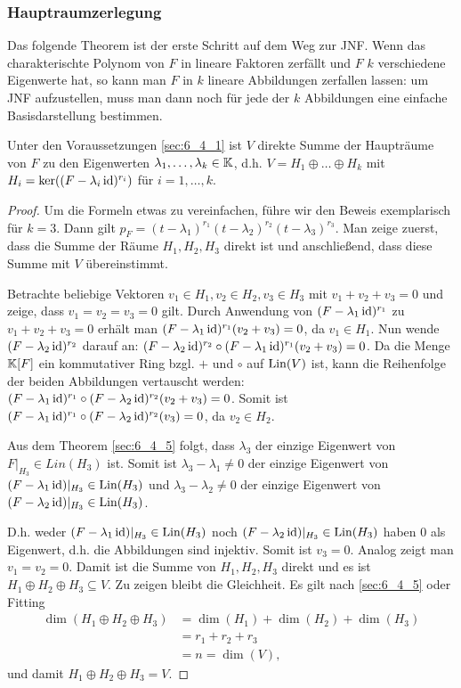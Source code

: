 \subsubsection{Hauptraumzerlegung}

Das folgende Theorem ist der erste Schritt auf dem Weg zur JNF. Wenn das charakterischte Polynom von $F$ in lineare Faktoren zerfällt und $F$ $k$ verschiedene Eigenwerte hat, so kann man $F$ in $k$ lineare Abbildungen zerfallen lassen: um JNF aufzustellen, muss man dann noch für jede der $k$ Abbildungen eine einfache Basisdarstellung bestimmen. 

\begin{thm}
	Unter den Voraussetzungen \ref{sec:6_4_1} ist $ V $ direkte Summe der Haupträume von $ F $ zu den Eigenwerten $ \lambda_1, \ldots, \lambda_k \in \mathbb K $, d.h. $ V = H_1 \oplus \ldots \oplus H_k $ mit $ H_i = \ker((F-\lambda_i\operatorname{id})^{r_i}) $ für $ i = 1, \ldots, k $.
\end{thm}
\begin{proof}
	Um die Formeln etwas zu vereinfachen, führe wir den Beweis exemplarisch für $ k = 3 $. Dann gilt $ p_F = (t-\lambda_1)^{r_1}(t-\lambda_2)^{r_2}(t-\lambda_3)^{r_3} $. Man zeige zuerst, dass die Summe der Räume $ H_1, H_2, H_3 $ direkt ist und anschließend, dass diese Summe mit $ V $ übereinstimmt.
	
	Betrachte beliebige Vektoren $ v_1 \in H_1, v_2 \in H_2, v_3 \in H_3 $ mit $ v_1 + v_2 + v_3 = 0 $ und zeige, dass $ v_1 = v_2 = v_3 = 0 $ gilt. Durch Anwendung von $ (F-\lambda_1\operatorname{id})^{r_1} $ zu $ v_1 + v_2 + v_3 = 0 $ erhält man $ (F-\lambda_1\operatorname{id})^{r_1}(v_2+v_3) = 0 $, da $ v_1 \in H_1 $. Nun wende $ (F-\lambda_2\operatorname{id})^{r_2} $ darauf an: $ (F-\lambda_2\operatorname{id})^{r_2} \circ (F-\lambda_1\operatorname{id})^{r_1}(v_2+v_3) = 0 $.
	Da die Menge $ \mathbb K[F] $ ein kommutativer Ring bzgl. $ + $ und $ \circ $ auf $ \operatorname{Lin}(V) $ ist, kann die Reihenfolge der beiden Abbildungen vertauscht werden: $ (F-\lambda_1\operatorname{id})^{r_1} \circ (F-\lambda_2\operatorname{id})^{r_2}(v_2 + v_3) = 0 $. Somit ist $ (F-\lambda_1\operatorname{id})^{r_1} \circ (F-\lambda_2\operatorname{id})^{r_2}(v_3) = 0 $, da $ v_2 \in H_2 $.
	
	Aus dem Theorem \ref{sec:6_4_5} folgt, dass $ \lambda_3 $ der einzige Eigenwert von $ F|_{H_3} \in Lin(H_3) $ ist. Somit ist $ \lambda_3 - \lambda_1 \neq 0 $ der einzige Eigenwert von $ (F-\lambda_1\operatorname{id})|_{H_3} \in \operatorname{Lin}(H_3) $ und $ \lambda_3 - \lambda_2 \neq 0 $ der einzige Eigenwert von $ (F-\lambda_2\operatorname{id})|_{H_3} \in \operatorname{Lin}(H_3) $.
	
	D.h. weder $ (F-\lambda_1\operatorname{id})|_{H_3} \in \operatorname{Lin}(H_3) $ noch $ (F-\lambda_2\operatorname{id})|_{H_3} \in \operatorname{Lin}(H_3) $ haben 0 als Eigenwert, d.h. die Abbildungen sind injektiv. Somit ist $ v_3 = 0 $. Analog zeigt man  $ v_1 = v_2 = 0 $.
	Damit ist die Summe von $ H_1, H_2, H_3 $ direkt und es ist $ H_1 \oplus H_2 \oplus H_3 \subseteq V $. Zu zeigen bleibt die Gleichheit. Es gilt nach \ref{sec:6_4_5} oder Fitting
	\begin{align*}
		\dim(H_1 \oplus H_2 \oplus H_3) &= \dim(H_1) + \dim(H_2) + \dim(H_3) \\
		&= r_1 + r_2 + r_3 \\
		&= n = \dim(V),
	\end{align*}
	und damit $ H_1 \oplus H_2 \oplus H_3 = V $.
\end{proof}

